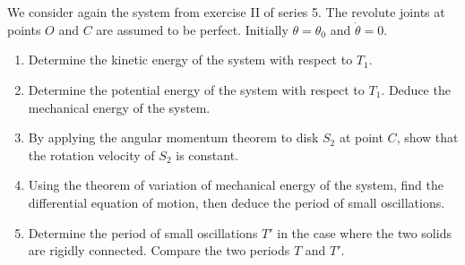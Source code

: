 \documentclass[12pt]{article}
\begin{document}
\section{}

We consider again the system from exercise II of series 5. The revolute joints at points $O$ and $C$ are assumed to be perfect. Initially $\theta = \theta_0$ and $\dot{\theta} = 0$.

\begin{enumerate}
    \item Determine the kinetic energy of the system with respect to $T_1$.
    \item Determine the potential energy of the system with respect to $T_1$. Deduce the mechanical energy of the system.
    \item By applying the angular momentum theorem to disk $S_2$ at point $C$, show that the rotation velocity of $S_2$ is constant.
    \item Using the theorem of variation of mechanical energy of the system, find the differential equation of motion, then deduce the period of small oscillations.
    \item Determine the period of small oscillations $T'$ in the case where the two solids are rigidly connected. Compare the two periods $T$ and $T'$.
\end{enumerate}
\end{document}
